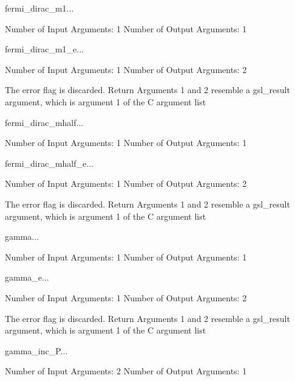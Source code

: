 \begin{funcdesc}{fermi_dirac_m1}{...}

    Number of Input  Arguments:  1
    Number of Output Arguments:  1
\end{funcdesc}

\begin{funcdesc}{fermi_dirac_m1_e}{...}

    Number of Input  Arguments:  1
    Number of Output Arguments:  2

The error flag is discarded.
Return Arguments 1 and 2 resemble a gsl_result argument,
	which is  argument 1 of the C argument list

\end{funcdesc}

\begin{funcdesc}{fermi_dirac_mhalf}{...}

    Number of Input  Arguments:  1
    Number of Output Arguments:  1
\end{funcdesc}

\begin{funcdesc}{fermi_dirac_mhalf_e}{...}

    Number of Input  Arguments:  1
    Number of Output Arguments:  2

The error flag is discarded.
Return Arguments 1 and 2 resemble a gsl_result argument,
	which is  argument 1 of the C argument list

\end{funcdesc}

\begin{funcdesc}{gamma}{...}

    Number of Input  Arguments:  1
    Number of Output Arguments:  1
\end{funcdesc}

\begin{funcdesc}{gamma_e}{...}

    Number of Input  Arguments:  1
    Number of Output Arguments:  2

The error flag is discarded.
Return Arguments 1 and 2 resemble a gsl_result argument,
	which is  argument 1 of the C argument list

\end{funcdesc}

\begin{funcdesc}{gamma_inc_P}{...}

    Number of Input  Arguments:  2
    Number of Output Arguments:  1
\end{funcdesc}

